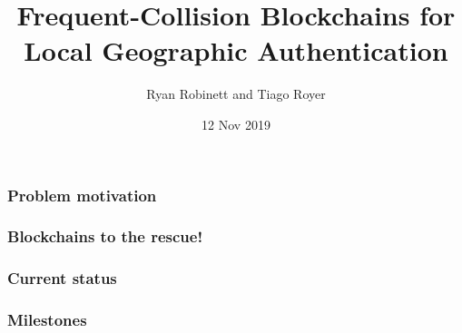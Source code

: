 \documentclass{beamer}
\begin{document}
\title{Frequent-Collision Blockchains for Local Geographic Authentication}
\author{Ryan Robinett and Tiago Royer}
\date{12 Nov 2019}

\begin{frame}
    \titlepage
\end{frame}

\begin{frame}
	\frametitle{Problem motivation}
\end{frame}

\begin{frame}
	\frametitle{Blockchains to the rescue!}
\end{frame}

\begin{frame}
	\frametitle{Current status}
\end{frame}

\begin{frame}
	\frametitle{Milestones}
\end{frame}
\end{document}
